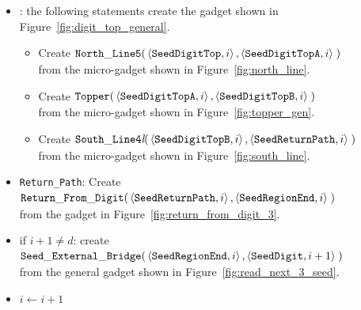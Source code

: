 \begin{itemize}
    \item {\dtop}: the following statements create the gadget shown in Figure~\ref{fig:digit_top_general}.
    \begin{itemize}
        \item Create
        $\begin{aligned}[t]
            {\tt North\_Line5}(&\left\langle {\tt SeedDigitTop},  i \right\rangle,
                                \left\langle {\tt SeedDigitTopA}, i \right\rangle \;)
        \end{aligned}$\\from the micro-gadget shown in Figure~\ref{fig:north_line}.

        \item Create
        $\begin{aligned}[t]
            {\tt Topper}(&\left\langle {\tt SeedDigitTopA}, i \right\rangle,
                          \left\langle {\tt SeedDigitTopB}, i \right\rangle \;)
        \end{aligned}$\\from the micro-gadget shown in Figure~\ref{fig:topper_gen}.

        \item Create
        $\begin{aligned}[t]
            {\tt South\_Line4\textit{l}}(&\left\langle {\tt SeedDigitTopB},  i \right\rangle,
                                          \left\langle {\tt SeedReturnPath}, i \right\rangle \;)
        \end{aligned}$\\from the micro-gadget shown in Figure~\ref{fig:south_line}.
    \end{itemize}

    \item {\tt Return\_Path}:
    Create
    $\begin{aligned}[t]
        {\tt Return\_From\_Digit}(&\left\langle {\tt SeedReturnPath},     i \right\rangle,
                          \left\langle {\tt SeedRegionEnd}, i \right\rangle \;)
    \end{aligned}$\\from the gadget in Figure~\ref{fig:return_from_digit_3}.

    \item if $i + 1\not=d$: create
    $\begin{aligned}[t]
        {\tt Seed\_External\_Bridge}(&\left\langle {\tt SeedRegionEnd}, i \right\rangle,
                                      \left\langle {\tt SeedDigit},   i + 1\right\rangle \;)
    \end{aligned}$\\from the general gadget shown in Figure~\ref{fig:read_next_3_seed}.

    \item $i \gets i + 1$

\end{itemize}


